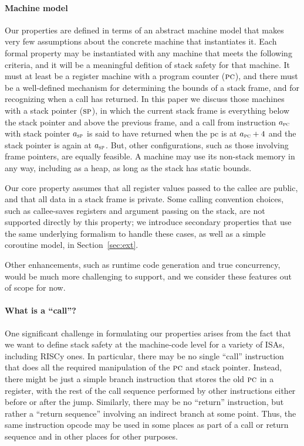 \documentclass[acmsmall,review,anonymous]{acmart}\settopmatter{printfolios=true,printccs=false,printacmref=false}
\begin{document}
\paragraph*{Machine model}
Our properties are defined in terms of an abstract machine model that makes very few
assumptions about the concrete machine that instantiates it. Each formal property
may be instantiated with any machine that meets the following criteria, and it
will be a meaningful defition of stack safety for that machine. It must at least be a
register machine with a program counter (\(\textsc{pc}\)), and there must be a well-defined
mechanism for determining the bounds of a stack frame, and for recognizing when a call
has returned. In this paper we discuss those machines with a stack pointer (\(\textsc{sp}\)),
in which the current stack frame is everything below the stack pointer and above the
previous frame, and a call from instruction \(a_{\textsc{pc}}\) with stack pointer \(a_{\textsc{sp}}\)
is said to have returned when the pc is at \(a_{\textsc{pc}} + 4\) and the stack pointer
is again at \(a_{\textsc{sp}}\). But, other configurations, such as those involving frame pointers,
are equally feasible. A machine may use its non-stack memory in any way, including
as a heap, as long as the stack has static bounds.

Our core property assumes that all register values passed to the callee are public,
and that all data in a stack frame is private.
Some calling convention choices, such as callee-saves registers and argument
passing on the stack, are not supported directly by this property; we introduce
secondary properties that use the same underlying formalism to handle these cases,
as well as a simple coroutine model, in Section~\ref{sec:ext}.

Other enhancements, such as runtime code generation and true concurrency,
would be much more challenging to support, and we consider these features
out of scope for now.

\paragraph*{What is a ``call''?}  One significant challenge in formulating our
properties arises from the fact that we want to define stack safety at the
machine-code level for a variety of ISAs, including RISCy
\ifaftersubmission{}\fi ones.  In
particular, there may be no single ``call'' instruction that does all the
required manipulation of the \(\textsc{pc}\) and stack pointer. Instead, there
might be just a simple branch instruction that stores the old \(\textsc{pc}\) in
a register, with the rest of the call sequence performed by other
instructions either before or after the jump.  Similarly, there may be no
``return'' instruction, but rather a ``return sequence'' involving an
indirect branch at some point.  Thus, the same instruction opcode may be
used in some places as part of a call or return sequence and in other places
for other purposes.
\end{document}
